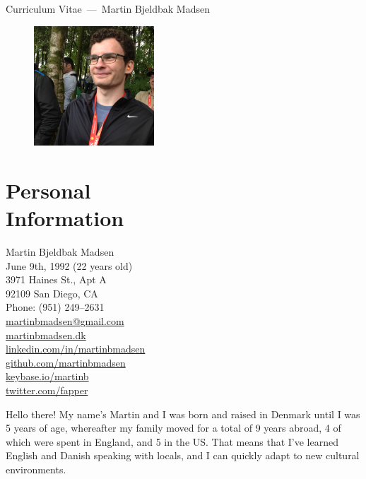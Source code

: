 \documentclass[margin,line]{resume}
\begin{document}
\raggedright%
{\sc \Large Curriculum Vitae~---~Martin Bjeldbak Madsen}
\begin{resume}
    \vspace{0.5cm}
    \begin{figure}
         \vspace{-1cm}
        \begin{center}
        \includegraphics[width=0.4\textwidth]{moi.png}
        \end{center}
         \vspace{-3.5cm}
    \end{figure}

\section{\mysidestyle{} Personal\\Information}%
    Martin Bjeldbak Madsen\\
    June 9th, 1992 (22 years old)\\ 
    3971 Haines St., Apt A\\
    92109 San Diego, CA \\
    Phone: (951) 249--2631\\
    \href{mailto:martinbmadsen@gmail.com}{martinbmadsen@gmail.com}\\
    \href{http://martinbmadsen.dk}{martinbmadsen.dk}\\
    \vspace{0.5cm}
    \href{http://dk.linkedin.com/in/martinbmadsen/}{linkedin.com/in/martinbmadsen}\\
    \href{https://github.com/martinbmadsen}{github.com/martinbmadsen}\\
    \href{https://keybase.io/martinb}{keybase.io/martinb}\\
    \href{https://twitter.com/fapper}{twitter.com/fapper}

    Hello there! My name's Martin and I was born and raised in Denmark until I was 5 years of age, whereafter my family moved for a total of 9 years abroad, 4 of which were spent in England, and 5 in the US\@. That means that I've learned English and Danish speaking with locals, and I can quickly adapt to new cultural environments.


\end{resume}
\end{document}

